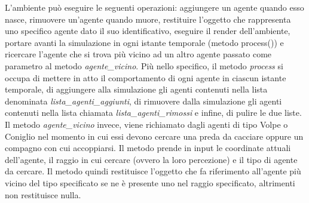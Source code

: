 \documentclass[11pt]{article}
\begin{document}
L'ambiente può eseguire le seguenti operazioni: aggiungere un agente quando esso nasce, rimuovere un'agente quando muore, restituire l'oggetto che rappresenta uno specifico agente dato il suo identificativo, eseguire il render dell'ambiente, portare avanti la simulazione in ogni istante temporale (metodo process()) e ricercare l'agente che si trova più vicino ad un altro agente passato come parametro al metodo \emph{agente\_vicino}. 
Più nello specifico, il metodo \emph{process} si occupa di mettere in atto il comportamento di ogni agente in ciascun istante temporale, di aggiungere alla simulazione gli agenti contenuti nella lista denominata \emph{lista\_agenti\_aggiunti}, di rimuovere dalla simulazione gli agenti contenuti nella lista chiamata \emph{lista\_agenti\_rimossi} e infine, di pulire le due liste. Il metodo \emph{agente\_vicino} invece, viene richiamato dagli agenti di tipo Volpe o Coniglio nel momento in cui essi devono cercare una preda da cacciare oppure un compagno con cui accoppiarsi. Il metodo prende in input le coordinate attuali dell'agente, il raggio in cui cercare (ovvero la loro percezione) e il tipo di agente da cercare. Il metodo quindi restituisce l'oggetto che fa riferimento all'agente più vicino del tipo specificato se ne è presente uno nel raggio specificato, altrimenti non restituisce nulla.    
\end{document}
